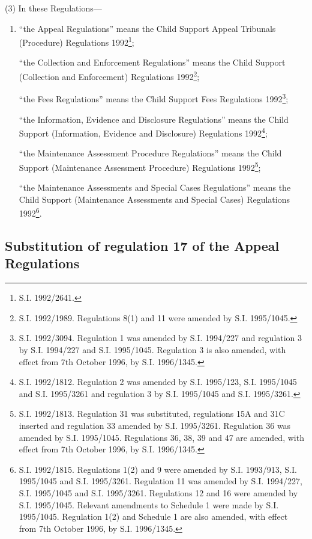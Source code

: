 \documentclass[a4paper]{article}
\begin{document}
(3) In these Regulations—
\begin{enumerate}\item[]
“the Appeal Regulations” means the Child Support Appeal Tribunals (Procedure) Regulations 1992\footnote{\frenchspacing S.I. 1992/2641.};

“the Collection and Enforcement Regulations” means the Child Support (Collection and Enforcement) Regulations 1992\footnote{\frenchspacing S.I. 1992/1989. Regulations 8(1) and 11 were amended by S.I. 1995/1045.};

“the Fees Regulations” means the Child Support Fees Regulations 1992\footnote{\frenchspacing S.I. 1992/3094. Regulation 1 was amended by S.I. 1994/227 and regulation 3 by S.I. 1994/227 and S.I. 1995/1045. Regulation 3 is also amended, with effect from 7th October 1996, by S.I. 1996/1345.};

“the Information, Evidence and Disclosure Regulations” means the Child Support (Information, Evidence and Disclosure) Regulations 1992\footnote{\frenchspacing S.I. 1992/1812. Regulation 2 was amended by S.I. 1995/123, S.I. 1995/1045 and S.I. 1995/3261 and regulation 3 by S.I. 1995/1045 and S.I. 1995/3261.};

“the Maintenance Assessment Procedure Regulations” means the Child Support (Maintenance Assessment Procedure) Regulations 1992\footnote{\frenchspacing S.I. 1992/1813. Regulation 31 was substituted, regulations 15A and 31C inserted and regulation 33 amended by S.I. 1995/3261. Regulation 36 was amended by S.I. 1995/1045. Regulations 36, 38, 39 and 47 are amended, with effect from 7th October 1996, by S.I. 1996/1345.};

“the Maintenance Assessments and Special Cases Regulations” means the Child Support (Maintenance Assessments and Special Cases) Regulations 1992\footnote{\frenchspacing S.I. 1992/1815. Regulations 1(2) and 9 were amended by S.I. 1993/913, S.I. 1995/1045 and S.I. 1995/3261. Regulation 11 was amended by S.I. 1994/227, S.I. 1995/1045 and S.I. 1995/3261. Regulations 12 and 16 were amended by S.I. 1995/1045. Relevant amendments to Schedule 1 were made by S.I. 1995/1045. Regulation 1(2) and Schedule 1 are also amended, with effect from 7th October 1996, by S.I. 1996/1345.}.
\end{enumerate}

\subsection[2. Substitution of regulation 17 of the Appeal Regulations]{Substitution of regulation 17 of the Appeal Regulations}
\end{document}
